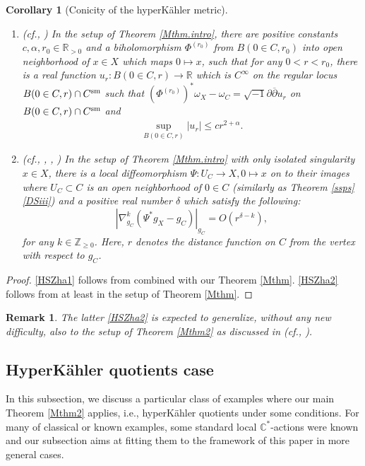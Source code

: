 \documentclass[12pt,a4paper]{amsart}
\newtheorem{Cor}[Thm]{Corollary}
\newtheorem{Rem}[Thm]{Remark}
\theoremstyle{remark}
\theoremstyle{definition}
\def\R{\mathbb{R}}
\def\C{\mathbb{C}}
\def\Z{\mathbb{Z}}
\begin{document}
\begin{Cor}[Conicity of the hyperK\"ahler metric]\label{cor:HSZha}

\begin{enumerate}
\item (cf., \cite[1.1]{ChiuSzek}) \label{HSZha1}
In the setup of Theorem \ref{Mthm.intro}, 
there are positive constants $c, \alpha, r_0\in \R_{>0}$ 
and a biholomorphism $\Phi^{(r_0)}$ 
from $B(0\in C,r_0)$ into 
open neighborhood of $x\in X$ which maps $0\mapsto x$, 
such that for any $0<r<r_0$, there is a 
real function $u_r\colon B(0\in C,r)\to \R$ 
which is $C^\infty$ on the regular locus 
$B(0\in C,r)\cap C^{\rm sm}$ 
such that 
$(\Phi^{(r_0)})^* \omega_X-\omega_C=\sqrt{-1}\partial 
\overline{\partial}u_r$ on $B(0\in C,r)\cap C^{\rm sm}$ and 
\begin{align*}
\sup_{B(0\in C,r)}|u_r|\le cr^{2+\alpha}. 
\end{align*}

\item (cf., \cite{HeinSun}, \cite[4.3]{ChiuSzek}, \cite[1.1, 1.4]{Zha24}) \label{HSZha2}
In the setup of Theorem \ref{Mthm.intro} 
with only isolated singularity $x\in X$, 
there is a local diffeomorphism  $\Psi\colon U_C \to X, 0\mapsto x$ on to their images where 
$U_C \subset C$ is an open neighborhood of $0\in C$
(similarly as Theorem \ref{ssps} \eqref{DSiii}) and a 
positive real number $\delta$ 
which satisfy the following: 
$$|\nabla^k_{g_C}(\Psi ^*g_X -g_C)|_{g_C}=O(r^{\delta-k}),$$ 
for any $k\in \Z_{\ge 0}$. Here, $r$ denotes the 
distance function on $C$ from the vertex with respect to 
$g_C$. 
\end{enumerate}
\end{Cor}

\begin{proof}
\eqref{HSZha1} follows from \cite[Thereom 1.1]{ChiuSzek} 
combined with our Theorem \ref{Mthm}. 
\eqref{HSZha2} follows from \cite[Corollary 4.3]{ChiuSzek} 
at least in the setup of Theorem \ref{Mthm}. 
\end{proof}
\begin{Rem}\label{Zha1exp}
The latter \eqref{HSZha2} is expected to generalize, 
without any new difficulty, also to 
the setup of Theorem \ref{Mthm2} as discussed in 
\cite[\S 1]{Zha24} (cf., \cite{HS, ChiuSzek}). 
\end{Rem}


\subsection{HyperK\"ahler quotients case}\label{subsec:HKQ}
In this subsection, we discuss a particular class of examples where 
our main Theorem \ref{Mthm2} applies, i.e., 
hyperK\"ahler quotients under some conditions. For many of 
classical or known examples, 
some standard local $\C^*$-actions were known and 
our subsection aims at fitting them to the framework of this paper 
in more general cases. 
\end{document}
